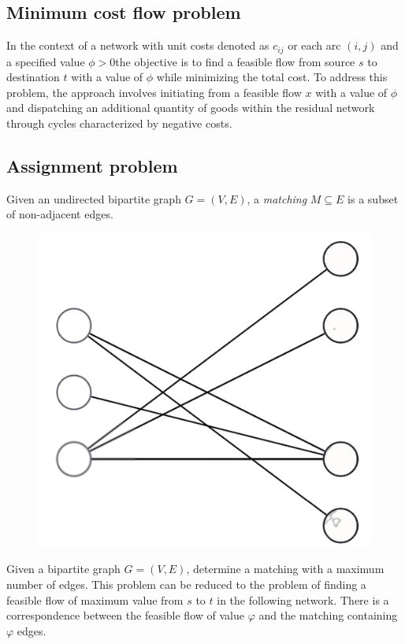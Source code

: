 \subsection*{Minimum cost flow problem}
In the context of a network with unit costs denoted as $c_{ij}$ or each arc  $(i,j)$ and a specified value $\phi > 0$the objective is to find a feasible flow from source $s$ to destination $t$ with a value of $\phi$ while minimizing the total cost.
To address this problem, the approach involves initiating from a feasible flow $x$ with a value of $\phi$ and dispatching an additional quantity of goods within the residual network through cycles characterized by negative costs.

\subsection*{Assignment problem}
\begin{definition}
    Given an undirected bipartite graph $G=(V,E)$, a \emph{matching} $M \subseteq E$ is a subset of non-adjacent edges. 
\end{definition}
\begin{figure}[H]
    \centering
    \includegraphics[width=0.2\linewidth]{images/matching.png}
\end{figure}
Given a bipartite graph $G=(V,E)$, determine a matching with a maximum number of edges. 
This problem can be reduced to the problem of finding a feasible flow of maximum value from $s$ to $t$ in the following network. 
There is a correspondence between the feasible flow of value $\varphi$ and the matching containing $\varphi$ edges. 
